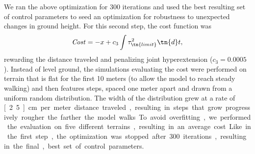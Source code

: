 We ran the above optimization for 300 iterations and used the best resulting set
of control parameters to seed an optimization for robustness to unexpected
changes in ground height. For this second step, the cost function was
\begin{align}
    \mathit{Cost} = -x + c_3 \int \tau_\tn{limit}^2 \tn{d}t,
\end{align}
rewarding the distance traveled and penalizing joint hyperextension ($c_3 =
0.0005$). Instead of level ground, the simulations evaluating the cost were
performed on terrain that is flat for the first 10 meters (to allow the model to
reach steady walking) and then features steps, spaced one meter apart and drawn
from a uniform random distribution. The width of the distribution grew at a rate
of \unit[2.5]{cm} per meter distance traveled, resulting in steps that grow
progressively rougher the farther the model walks. To avoid overfitting, we
performed the evaluation on five different terrains, resulting in an average
cost. Like in the first step, the optimization was stopped after 300 iterations,
resulting in the final, best set of control parameters.
